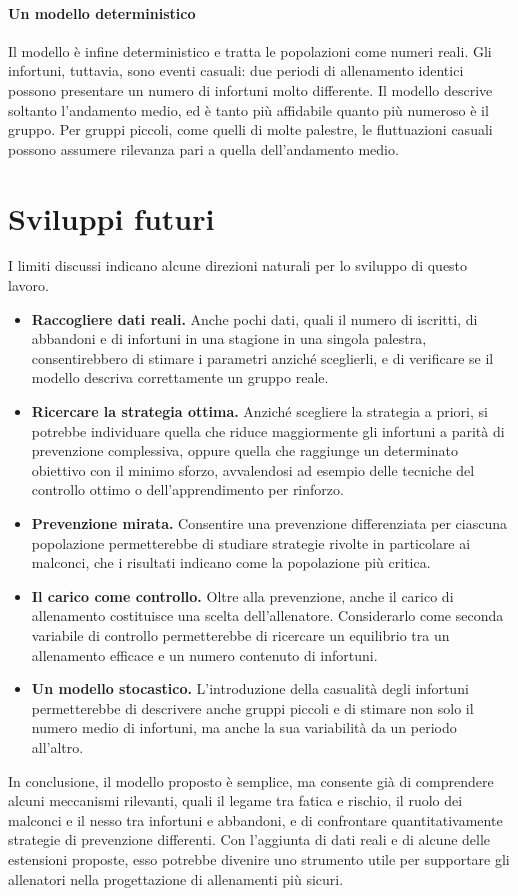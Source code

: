 \paragraph{Un modello deterministico}

Il modello è infine deterministico e tratta le popolazioni come numeri reali. Gli infortuni, tuttavia, sono eventi casuali: due periodi di allenamento identici possono presentare un numero di infortuni molto differente. Il modello descrive soltanto l'andamento medio, ed è tanto più affidabile quanto più numeroso è il gruppo. Per gruppi piccoli, come quelli di molte palestre, le fluttuazioni casuali possono assumere rilevanza pari a quella dell'andamento medio.

\section{Sviluppi futuri}

I limiti discussi indicano alcune direzioni naturali per lo sviluppo di questo lavoro.
\begin{itemize}
    \item \textbf{Raccogliere dati reali.} Anche pochi dati, quali il numero di iscritti, di abbandoni e di infortuni in una stagione in una singola palestra, consentirebbero di stimare i parametri anziché sceglierli, e di verificare se il modello descriva correttamente un gruppo reale.
    \item \textbf{Ricercare la strategia ottima.} Anziché scegliere la strategia a priori, si potrebbe individuare quella che riduce maggiormente gli infortuni a parità di prevenzione complessiva, oppure quella che raggiunge un determinato obiettivo con il minimo sforzo, avvalendosi ad esempio delle tecniche del controllo ottimo o dell'apprendimento per rinforzo.
    \item \textbf{Prevenzione mirata.} Consentire una prevenzione differenziata per ciascuna popolazione permetterebbe di studiare strategie rivolte in particolare ai malconci, che i risultati indicano come la popolazione più critica.
    \item \textbf{Il carico come controllo.} Oltre alla prevenzione, anche il carico di allenamento costituisce una scelta dell'allenatore. Considerarlo come seconda variabile di controllo permetterebbe di ricercare un equilibrio tra un allenamento efficace e un numero contenuto di infortuni.
    \item \textbf{Un modello stocastico.} L'introduzione della casualità degli infortuni permetterebbe di descrivere anche gruppi piccoli e di stimare non solo il numero medio di infortuni, ma anche la sua variabilità da un periodo all'altro.
\end{itemize}

In conclusione, il modello proposto è semplice, ma consente già di comprendere alcuni meccanismi rilevanti, quali il legame tra fatica e rischio, il ruolo dei malconci e il nesso tra infortuni e abbandoni, e di confrontare quantitativamente strategie di prevenzione differenti. Con l'aggiunta di dati reali e di alcune delle estensioni proposte, esso potrebbe divenire uno strumento utile per supportare gli allenatori nella progettazione di allenamenti più sicuri.